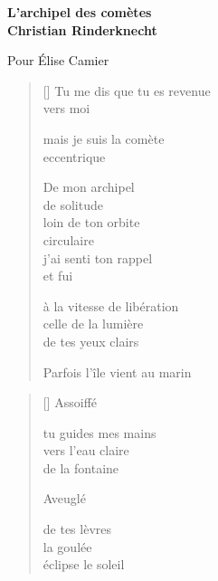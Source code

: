 \documentclass[11pt,a4paper]{book}
\begin{document}
\thispagestyle{empty}

\vspace*{70mm}

\begin{center}
{\Huge\textbf{L'archipel des comètes}} \\
\bigskip
\textbf{Christian Rinderknecht}
\end{center}

\bigskip\bigskip\bigskip
\hfill Pour Élise Camier

\newpage


\settowidth{\versewidth}{Parfois l'île vient au marin}

\bigskip

\begin{verse}[\versewidth]
  Tu me dis que tu es revenue \\
  vers moi

  mais je suis la comète \\
  eccentrique

  De mon archipel \\
  de solitude \\
  loin de ton orbite \\
  circulaire \\
  j'ai senti ton rappel \\
  et fui

  à la vitesse de libération \\
  celle de la lumière \\
  de tes yeux clairs

  Parfois l'île vient au marin
\end{verse}

\newpage


\settowidth{\versewidth}{fait pâlir le soleil}

\bigskip

\begin{verse}[\versewidth]
  Assoiffé

  tu guides mes mains \\
  vers l'eau claire \\
  de la fontaine

  Aveuglé

  de tes lèvres \\
  la goulée \\
  éclipse le soleil
\end{verse}
\end{document}
